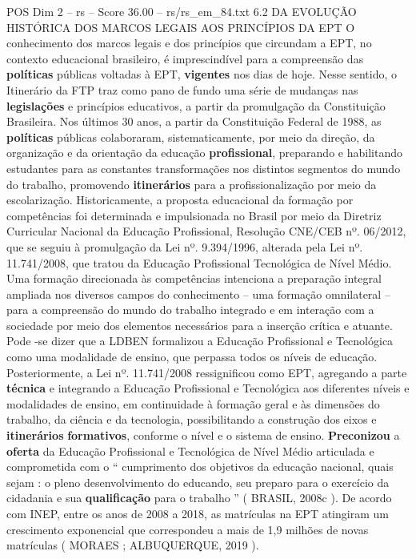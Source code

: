\begin{textsample}{POS Dim 2 – rs – Score 36.00 – rs/rs\_em\_84.txt}  \label{ex:f2_pos_071}
6.2 DA EVOLUÇÃO HISTÓRICA DOS MARCOS LEGAIS AOS PRINCÍPIOS DA EPT O conhecimento dos marcos legais e dos princípios que circundam a EPT, no contexto educacional brasileiro, é imprescindível para a compreensão das \textbf{políticas} públicas voltadas à EPT, \textbf{vigentes} nos dias de hoje.
Nesse sentido, o Itinerário da FTP traz como pano de fundo uma série de mudanças nas \textbf{legislações} e princípios educativos, a partir da promulgação da Constituição Brasileira.
Nos últimos 30 anos, a partir da Constituição Federal de 1988, as \textbf{políticas} públicas colaboraram, sistematicamente, por meio da direção, da organização e da orientação da educação \textbf{profissional}, preparando e habilitando estudantes para as constantes transformações nos distintos segmentos do mundo do trabalho, promovendo \textbf{itinerários} para a profissionalização por meio da escolarização.
Historicamente, a proposta educacional da formação por competências foi determinada e impulsionada no Brasil por meio da Diretriz Curricular Nacional da Educação Profissional, Resolução CNE/CEB nº. 06/2012, que se seguiu à promulgação da Lei nº. 9.394/1996, alterada pela Lei nº. 11.741/2008, que tratou da Educação Profissional Tecnológica de Nível Médio.
Uma formação direcionada às competências intenciona a preparação integral ampliada nos diversos campos do conhecimento – uma formação omnilateral – para a compreensão do mundo do trabalho integrado e em interação com a sociedade por meio dos elementos necessários para a inserção crítica e atuante.
Pode -se dizer que a LDBEN formalizou a Educação Profissional e Tecnológica como uma modalidade de ensino, que perpassa todos os níveis de educação.
Posteriormente, a Lei nº. 11.741/2008 ressignificou como EPT, agregando a parte \textbf{técnica} e integrando a Educação Profissional e Tecnológica aos diferentes níveis e modalidades de ensino, em continuidade à formação geral e às dimensões do trabalho, da ciência e da tecnologia, possibilitando a construção dos eixos e \textbf{itinerários} \textbf{formativos}, conforme o nível e o sistema de ensino. \textbf{Preconizou} a \textbf{oferta} da Educação Profissional e Tecnológica de Nível Médio articulada e comprometida com o “ cumprimento dos objetivos da educação nacional, quais sejam : o pleno desenvolvimento do educando, seu preparo para o exercício da cidadania e sua \textbf{qualificação} para o trabalho ” ( BRASIL, 2008c ).
De acordo com INEP, entre os anos de 2008 a 2018, as matrículas na EPT atingiram um crescimento exponencial que correspondeu a mais de 1,9 milhões de novas matrículas ( MORAES ; ALBUQUERQUE, 2019 ).

\end{textsample}
